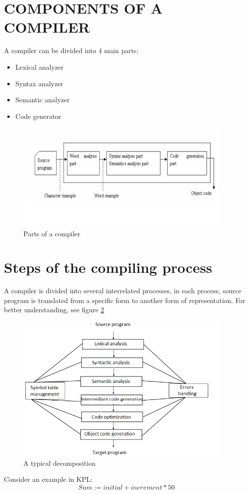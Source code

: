 \documentclass[12pt, a4paper]{report}
\begin{document}
		\section{COMPONENTS OF A COMPILER}		
			\tab A compiler can be divided into 4 main parts:
			\begin{itemize}
				\item Lexical analyzer
				\item Syntax analyzer
				\item Semantic analyzer
				\item Code generator
			\end{itemize}
			\begin{figure}[h]
				\centering
				\includegraphics[width=0.95\textwidth]{compileStage.png}
				\caption{Parts of a compiler}
				\label{fig:stage}
			\end{figure}
		\section{Steps of the compiling process}
			\tab A compiler is divided into several interrelated processes,  in each process, source program is translated from a specific form to another form of representation. For better understanding, see figure \ref{fig:decomp}
			\begin{figure}[h!]
				\centering
				\includegraphics[width=0.95\textwidth]{step.png}
				\caption{A typical decomposition}
				\label{fig:decomp}
			\end{figure}
			\newline
			\tab Consider an example in KPL:
			\begin{equation}
				\label{eq:1}
				Sum := initial + increment * 50
			\end{equation}
\end{document}
